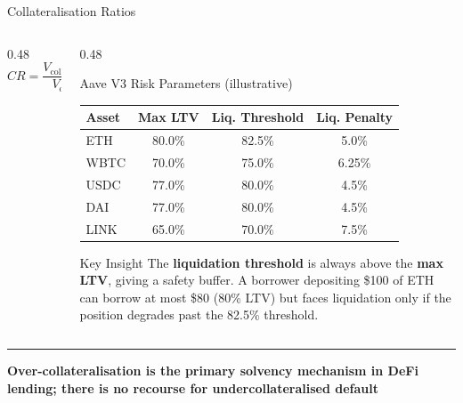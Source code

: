 \documentclass[8pt,aspectratio=169]{beamer}
\newcommand{\bottomnote}[1]{\vfill\vspace{-2mm}\textcolor{mllavender2}{\rule{\textwidth}{0.4pt}}\vspace{1mm}\footnotesize\textbf{#1}}
\begin{document}
\begin{frame}{Collateralisation Ratios}
\begin{columns}[T]
\begin{column}{0.48\textwidth}
      \vspace{4mm}
      \footnotesize
      \[
        CR = \frac{V_{\text{collateral}}}{V_{\text{debt}}} \qquad \text{LTV} = \frac{V_{\text{debt}}}{V_{\text{collateral}}}
      \]
    \end{column}
    \begin{column}{0.48\textwidth}
      \begin{block}{Aave V3 Risk Parameters (illustrative)}
        \begin{center}
        \footnotesize
        \begin{tabular}{lccc}
          \toprule
          \textbf{Asset} & \textbf{Max LTV} & \textbf{Liq. Threshold} & \textbf{Liq. Penalty} \\
          \midrule
          ETH   & 80.0\% & 82.5\% & 5.0\%   \\
          WBTC  & 70.0\% & 75.0\% & 6.25\%  \\
          USDC  & 77.0\% & 80.0\% & 4.5\%   \\
          DAI   & 77.0\% & 80.0\% & 4.5\%   \\
          LINK  & 65.0\% & 70.0\% & 7.5\%   \\
          \bottomrule
        \end{tabular}
        \end{center}
      \end{block}
      \vspace{3mm}
      \begin{alertblock}{Key Insight}
        The \textbf{liquidation threshold} is always above the \textbf{max LTV}, giving a safety buffer.
        A borrower depositing \$100 of ETH can borrow at most \$80 (80\% LTV) but faces liquidation
        only if the position degrades past the 82.5\% threshold.
      \end{alertblock}
    \end{column}
  \end{columns}
  \bottomnote{Over-collateralisation is the primary solvency mechanism in DeFi lending; there is no recourse for undercollateralised default}
\end{frame}
\end{document}
